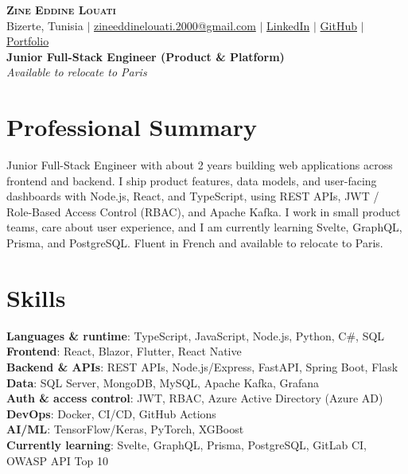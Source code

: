 \documentclass[letterpaper,11pt]{article}
\begin{document}
\begin{center}
    \textbf{\Huge \scshape Zine Eddine Louati} \\ \vspace{2pt}
    \small
    Bizerte, Tunisia $|$
    \href{mailto:zineeddinelouati.2000@gmail.com}{zineeddinelouati.2000@gmail.com} $|$
    \href{https://www.linkedin.com/in/zine-louati/}{LinkedIn} $|$
    \href{https://github.com/louatizine}{GitHub} $|$
    \href{https://zayneddine.me}{Portfolio} \\
    \vspace{1pt}
    \textbf{Junior Full-Stack Engineer (Product \& Platform)}
    \\ \textit{\small Available to relocate to Paris}
\end{center}


\section{Professional Summary}
\small{Junior Full-Stack Engineer with about 2 years building web applications across frontend and backend. I ship product features, data models, and user-facing dashboards with Node.js, React, and TypeScript, using REST APIs, JWT / Role-Based Access Control (RBAC), and Apache Kafka. I work in small product teams, care about user experience, and I am currently learning Svelte, GraphQL, Prisma, and PostgreSQL. Fluent in French and available to relocate to Paris.}


\section{Skills}
 \begin{itemize}[leftmargin=0.15in, label={}]
    \small{\item{
     \textbf{Languages \& runtime}{: TypeScript, JavaScript, Node.js, Python, C\#, SQL} \\
     \textbf{Frontend}{: React, Blazor, Flutter, React Native} \\
     \textbf{Backend \& APIs}{: REST APIs, Node.js/Express, FastAPI, Spring Boot, Flask} \\
     \textbf{Data}{: SQL Server, MongoDB, MySQL, Apache Kafka, Grafana} \\
     \textbf{Auth \& access control}{: JWT, RBAC, Azure Active Directory (Azure AD)} \\
     \textbf{DevOps}{: Docker, CI/CD, GitHub Actions} \\
     \textbf{AI/ML}{: TensorFlow/Keras, PyTorch, XGBoost} \\
     \textbf{Currently learning}{: Svelte, GraphQL, Prisma, PostgreSQL, GitLab CI, OWASP API Top 10}
    }}
 \end{itemize}
\end{document}
